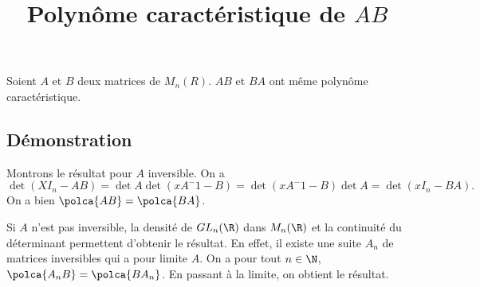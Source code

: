 \documentclass[fontsize=12pt,twoside=false,parskip=half, french]{scrartcl}
\title{Polynôme caractéristique de $AB$}
\date{}
\author{}
\begin{document}
\maketitle
   \begin{Theoreme}
      Soient $A$ et $B$ deux matrices de $M_n(R)$. $AB$ et $BA$ ont même polynôme caractéristique.  
   \end{Theoreme}
   \subsection{Démonstration}
      Montrons le résultat pour $A$ inversible. On a 
      \[
         \det(XI_n - AB) = \det A \det(xA^-1 - B) = \det(xA^-1 - B) \det A = \det(xI_n - BA).
      \]
      On a bien $\polca{AB} = \polca{BA}$.
      
      Si $A$ n’est pas inversible, la densité de $GL_n(\R)$ dans $M_n(\R)$ et la continuité du
      déterminant permettent d’obtenir le résultat. En effet, il existe une suite $A_n$ de matrices 
      inversibles qui a pour limite $A$. On a pour tout $n \in \N$, $\polca{A_nB} = \polca{BA_n}$.
      En passant à la limite, on obtient le résultat.
\end{document}
